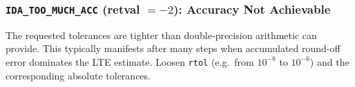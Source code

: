 \begin{refsection}
\subsubsection{\texttt{IDA\_TOO\_MUCH\_ACC} (retval $= -2$): Accuracy Not Achievable}

The requested tolerances are tighter than double-precision arithmetic can provide. This typically manifests after many steps when accumulated round-off error dominates the LTE estimate. Loosen \texttt{rtol} (e.g.\ from $10^{-8}$ to $10^{-6}$) and the corresponding absolute tolerances.

\printbibliography[heading=subbibliography,title={References}]
\end{refsection}
